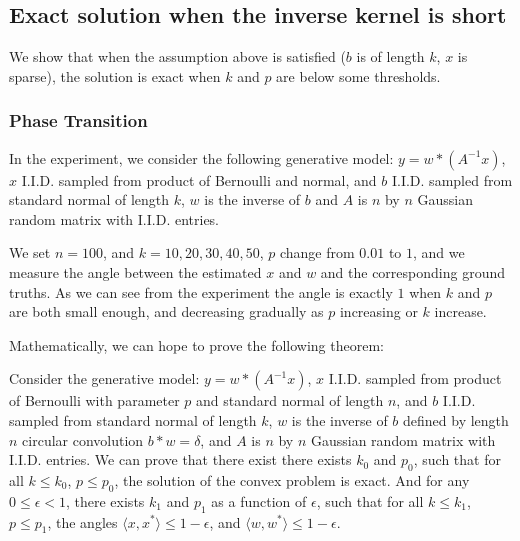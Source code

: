 \documentclass[letter, 10pt]{article}
\numberwithin{equation}{section}
\begin{document}
\subsection{Exact solution when the inverse kernel is short}
We show that when the assumption above is satisfied ($b$ is of length $k$, $x$ is sparse), the solution is exact when $k$ and $p$ are below some thresholds.
\subsubsection{Phase Transition}
In the experiment, we consider the following generative model: $y = w * (A^{-1}x)$,  $x$ I.I.D. sampled from product of Bernoulli and normal, and $b$ I.I.D. sampled from standard normal of length $k$, $w$ is the inverse of $b$ and $A$ is $n$ by $n$ Gaussian random matrix with I.I.D. entries.

We set $n=100$, and $k= 10, 20, 30, 40, 50$, $p$ change from $0.01$ to $1$, and we measure the angle between the estimated $x$ and $w$ and the corresponding ground truths. As we can see from the experiment the angle is exactly $1$ when $k$ and $p$ are both small enough, and decreasing gradually as $p$ increasing or $k$ increase. 

Mathematically, we can hope to prove the following theorem: 

Consider the generative model: $y = w * (A^{-1}x)$,  $x$ I.I.D. sampled from product of Bernoulli with parameter $p$ and standard normal of length $n$, and $b$ I.I.D. sampled from standard normal of length $k$, $w$ is the inverse of $b$ defined by length $n$ circular convolution $b* w = \delta$,  and $A$ is $n$ by $n$ Gaussian random matrix with I.I.D. entries. We can prove that there exist
there exists $k_0$ and $p_0$, such that for all $k \leq k_0$, $ p\leq p_0$,  the solution of the convex problem is exact. And 
for any $0\leq \epsilon<1$, there exists $k_1$ and $p_{1}$ as a function of $\epsilon$, such that for all $k \leq k_1$, $p\leq p_1$, the angles 
$\langle x, x^*\rangle\leq 1-\epsilon$, and $\langle w, w^*\rangle\leq 1-\epsilon$. 
\end{document}
